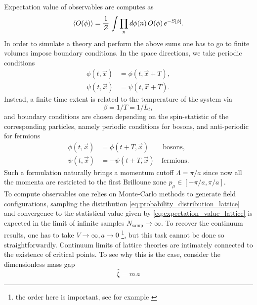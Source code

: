 Expectation value of observables are computes as
\begin{equation}
    \left\langle O(\phi) \right\rangle  = \frac{1}{Z} \, \int \prod_n d\phi(n) \, O(\phi) \, e^{-S[\phi]}.
    \label{eq:expectation_value_lattice}
\end{equation}
In order to simulate a theory and perform the above sums one has to go to finite volumes impose boundary conditions. In the space directions, we take periodic conditions 
\begin{equation*}
    \begin{aligned}
        \phi(t, \vec x) &= \phi(t, \vec x + T), \\
        \psi(t, \vec x) &= \psi(t, \vec x + T).
    \end{aligned}
\end{equation*}
Instead, a finite time extent is related to the temperature of the system \cite{le_bellac_1996,rothe_LGT} via
\begin{equation*}
    \beta = 1/T = 1/L_t,
\end{equation*}
and boundary conditions are chosen depending on the spin-statistic of the corresponding particles, namely periodic conditions for bosons, and anti-periodic for fermions
\begin{equation*}
    \begin{aligned}
        \phi(t, \vec x) &= \phi(t + T, \vec x) \qquad \text{bosons}, \\
        \psi(t, \vec x) &= -\psi(t + T, \vec x) \quad \text{fermions}.
    \end{aligned}
\end{equation*}
Such a formulation naturally brings a momentum cutoff $\Lambda = \pi/a$ since now all the momenta are restricted to the first Brilloune zone $p_\mu \in [-\pi/a, \pi/a]$. \\
To compute observables one relies on Monte-Carlo methods to generate field configurations, sampling the distribution \eqref{eq:probability_distribution_lattice} and convergence to the statistical value given by \eqref{eq:expectation_value_lattice} is expected in the limit of infinite samples $N_\text{samp} \to \infty$. To recover the continuum results, one has to take $V \to \infty, a \to 0$ \footnote{the order here is important, see for example \cite{seiler}}, but this task cannot be done so straightforwardly.
Continuum limits of lattice theories are intimately connected to the existence of critical points. To see why this is the case, consider the dimensionless mass gap 
\begin{equation*}   
    \hat\xi = m \, a
\end{equation*} 
